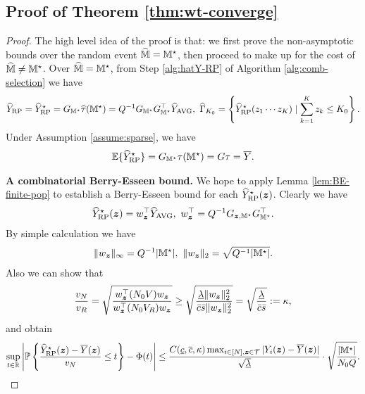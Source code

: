 \documentclass[12pt]{article}
\begin{document}
\subsection{Proof of Theorem \ref{thm:wt-converge}}
\begin{proof}
The high level idea of the proof is that: we first prove the non-asymptotic bounds over the random event $\widehat{{\mathbb{M}}} = {\mathbb{M}}^\star$, then proceed to make up for the cost of $\widehat{{\mathbb{M}}} \neq {\mathbb{M}}^\star$. Over $\widehat{{\mathbb{M}}} = {\mathbb{M}}^\star$, from Step \ref{alg:hatY-RP} of Algorithm \ref{alg:comb-selection} we have 
\begin{align*}
    \widehat{Y}_{\operatorname{RP}} = \widehat{Y}^\star_{\operatorname{RP}} = G_{{\mathbb{M}}^\star} {\widehat{\tau}}({\mathbb{M}}^\star) = Q^{-1}G_{{\mathbb{M}}^\star}G_{{\mathbb{M}}^\star}^\top {\widehat{Y}}_{\operatorname{AVG}}, ~{\widehat{\Gamma}}_{K_0} = \left\{{\widehat{Y}}^\star_{\operatorname{RP}}(z_1\cdots z_K)\mid \sum_{k=1}^K z_k \le K_0\right\}.
\end{align*}
Under Assumption \ref{assume:sparse}, we have 
\begin{align*}
    {\mathbb{E}}\{\widehat{Y}^\star_{\operatorname{RP}}\} = G_{{\mathbb{M}}^\star} \tau({\mathbb{M}}^\star) = G\tau = \overline{Y}.
\end{align*}


\textbf{A combinatorial Berry-Esseen bound.}
We hope to apply Lemma \ref{lem:BE-finite-pop} to establish a Berry-Esseen bound for each ${\widehat{Y}}^\star_{\operatorname{RP}}({\boldsymbol{z}})$. Clearly we have
\begin{align}\label{eqn:hY-RP-star}
    {\widehat{Y}}^\star_{\operatorname{RP}}({\boldsymbol{z}}) = w_{{\boldsymbol{z}}}^\top {\widehat{Y}}_{\operatorname{AVG}}, ~w_{{\boldsymbol{z}}}^\top = Q^{-1}G_{{\boldsymbol{z}}, {\mathbb{M}}^\star} G_{{\mathbb{M}}^\star}^\top.
\end{align}
By simple calculation we have
\begin{align*}
    \|w_{{\boldsymbol{z}}}\|_\infty = Q^{-1}|{\mathbb{M}}^\star|, ~\|w_{{\boldsymbol{z}}}\|_2 = \sqrt{Q^{-1} |{\mathbb{M}}^\star|}.
\end{align*}
Also we can show that
\begin{align*}
    \frac{v_N}{v_R} = \sqrt{\frac{w_{{\boldsymbol{z}}}^\top (N_0V) w_{{\boldsymbol{z}}}}{w_{{\boldsymbol{z}}}^\top (N_0V_R) w_{{\boldsymbol{z}}}}} \ge \sqrt{\frac{\underline{\lambda} \|w_{{\boldsymbol{z}}}\|_2^2}{\bar{c}\bar{s}\|w_{{\boldsymbol{z}}}\|_2^2}} = \sqrt{\frac{\underline{\lambda}}{\bar{c}\bar{s}}} := \kappa,
\end{align*}
and obtain
\begin{align}\label{eqn:BE-marginal-t}
  \sup_{t\in{\mathbb{R}}} \left|{\mathbb{P}}\left\{\frac{{\widehat{Y}}^\star_{\operatorname{RP}}({\boldsymbol{z}}) - \overline{Y}({\boldsymbol{z}})}{v_N}\le t\right\} - \Phi(t)\right| \le \frac{C(\underline{c}, \overline{c}, \kappa) \max_{i\in[N],{\boldsymbol{z}}\in{\mathcal{T}}}|Y_i({\boldsymbol{z}}) - \overline{Y}({\boldsymbol{z}})| }{\sqrt{\underline{\lambda}}}\cdot \sqrt{\frac{|{\mathbb{M}}^\star|}{ N_0Q}}.
\end{align}



\end{proof}
\end{document}
